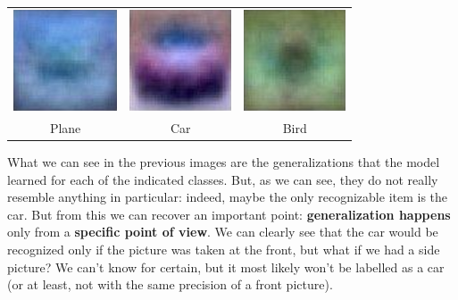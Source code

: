 \begin{center}
    \begin{tabular}{c c c}
        \includegraphics[height=3cm]{imgs/007.png} & \includegraphics[height=3cm]{imgs/008.png} & \includegraphics[height=3cm]{imgs/009.png} \\
        Plane & Car & Bird
    \end{tabular}
\end{center}

What we can see in the previous images are the generalizations that the model learned for each of the indicated classes. But, as we can see, they do not really resemble anything in particular: indeed, maybe the only recognizable item is the car. But from this we can recover an important point: \textbf{generalization happens} only from a \textbf{specific point of view}. We can clearly see that the car would be recognized only if the picture was taken at the front, but what if we had a side picture? We can't know for certain, but it most likely won't be labelled as a car (or at least, not with the same precision of a front picture).